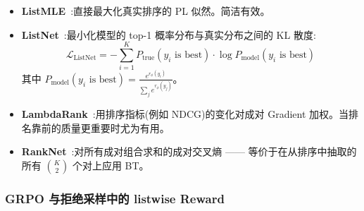 \begin{keybox}
\begin{itemize}
  \item \textbf{ListMLE}~\cite{xia2008listwise}:直接最大化真实排序的 PL 似然。简洁有效。
  \item \textbf{ListNet}~\cite{cao2007listnet}:最小化模型的 top-1 概率分布与真实分布之间的 KL 散度:
\[
\mathcal{L}_{\text{ListNet}} = -\sum_{i=1}^{K} P_{\text{true}}(y_i \text{ is best}) \cdot \log P_{\text{model}}(y_i \text{ is best})
\]
 其中 $P_{\text{model}}(y_i \text{ is best}) = \frac{e^{r_\phi(y_i)}}{\sum_j e^{r_\phi(y_j)}}$。
  \item \textbf{LambdaRank}~\cite{burges2006lambdarank}:用排序指标(例如 NDCG)的变化对成对 Gradient 加权。当排名靠前的质量更重要时尤为有用。
  \item \textbf{RankNet}~\cite{burges2005ranknet}:对所有成对组合求和的成对交叉熵 —— 等价于在从排序中抽取的所有 $\binom{K}{2}$ 个对上应用 BT。
\end{itemize}
\end{keybox}

\subsubsection*{GRPO 与拒绝采样中的 listwise Reward}
\label{listwise-rewards-for-grpo-and-rejection-sampling}


